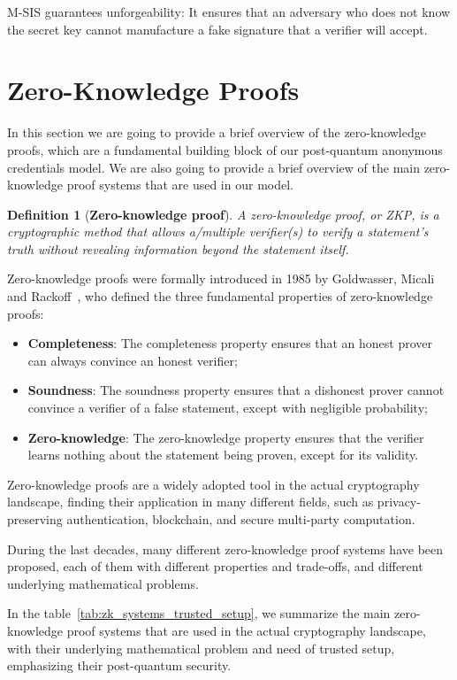 \documentclass[binding=0.6cm,oneside,noexaminfo]{sapthesis}
\newtheorem{definition}{Definition}
\begin{document}
M-SIS guarantees unforgeability: It ensures that an adversary who does not know the secret key cannot manufacture a fake signature that a verifier will accept.



\section{Zero-Knowledge Proofs}
\label{zkproofs}
In this section we are going to provide a brief overview of the zero-knowledge proofs, 
which are a fundamental building block of our post-quantum anonymous credentials model.
We are also going to provide a brief overview of the main zero-knowledge proof systems 
that are used in our model.

\begin{definition}[\textbf{Zero-knowledge proof}]
  A zero-knowledge proof, or ZKP, is a cryptographic method that allows a/multiple verifier(s) 
  to verify a statement’s truth without revealing information beyond the statement itself. 
\end{definition}

Zero-knowledge proofs were formally introduced in 1985 by Goldwasser, Micali
and Rackoff~\cite{Goldwasser1989Knowledge}, who defined the three fundamental properties of zero-knowledge proofs:
\begin{itemize}
  \item \textbf{Completeness}: The completeness property ensures that
  an honest prover can always convince an honest verifier;
  \item \textbf{Soundness}: The soundness property ensures that a 
  dishonest prover cannot convince a verifier of a false statement, except with
  negligible probability;
  \item \textbf{Zero-knowledge}: The zero-knowledge property ensures that the verifier 
  learns nothing about the statement being proven, except for its validity.
\end{itemize}
Zero-knowledge proofs are a widely adopted tool in the actual cryptography landscape,
finding their application in many different fields, such as privacy-preserving authentication,
blockchain, and secure multi-party computation.

During the last decades, many different zero-knowledge proof systems have been proposed,
each of them with different properties and trade-offs, and different underlying mathematical problems.

In the table~\ref{tab:zk_systems_trusted_setup}, we summarize the main zero-knowledge proof systems that are used
in the actual cryptography landscape, with their underlying mathematical problem and need of trusted setup,
emphasizing their post-quantum security.
\end{document}
